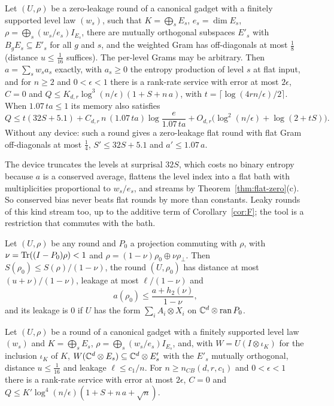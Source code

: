 \begin{theorem}\label{thm:conserved}
Let $(U,\rho)$ be a zero-leakage round of a canonical gadget with a
finitely supported level law $(w_s)$, such that $K=\bigoplus_sE_s$, $e_s=\dim E_s$, $\rho=\bigoplus_s(w_s/e_s)I_{E_s}$, there are
mutually orthogonal subspaces $E'_s$ with $B_gE_s\subseteq E'_s$ for all $g$ and $s$, and the weighted Gram has off-diagonals at most $\frac18$
(distance $u\le\frac1{16}$ suffices). The per-level Grams may be arbitrary. Then $a=\sum_sw_sa_s$ exactly, with $a_s\ge0$ the entropy
production of level $s$ at flat input, and for $n\ge2$ and $0<\epsilon<1$ there is a rank-rate service with error at most $2\epsilon$, $C=0$ and
$Q\le K_{d,r}\log^3(n/\epsilon)(1+S+n\,a)$, with $t=\lceil\log(4rn/\epsilon)/2\rceil$. When $1.07\,ta\le1$ its memory also satisfies
\[
Q\le t(32S+5.1)+C_{d,r}\,n\,(1.07\,ta)\log\frac e{1.07\,ta}+O_{d,r}\bigl(\log^2(n/\epsilon)+\log(2+tS)\bigr).
\] Without any device: such a round gives a zero-leakage flat round with flat Gram off-diagonals at most
$\frac14$, $S'\le32S+5.1$ and $a'\le1.07\,a$.
\end{theorem}

The device truncates the levels at surprisal $32S$, which costs no binary entropy because $a$ is a conserved average, flattens the level index
into a flat bath with multiplicities proportional to $w_s/e_s$, and streams by Theorem~\ref{thm:flat-zero}(c). So conserved bias never beats
flat rounds by more than constants. Leaky rounds of this kind stream too, up to the additive term of Corollary~\ref{cor:F}; the tool is a
restriction that commutes with the bath.

\begin{lemma}\label{lem:restrict-biased}
Let $(U,\rho)$ be any round and $P_0$ a projection commuting with $\rho$, with $\nu=\operatorname{Tr}((I-P_0)\rho)<1$ and $\rho=(1-\nu)\rho_0\oplus\nu\rho_\perp$.
Then $S(\rho_0)\le S(\rho)/(1-\nu)$, the round $(U,\rho_0)$ has distance at most $(u+\nu)/(1-\nu)$, leakage at most $\ell/(1-\nu)$ and
\[
a(\rho_0)\le\frac{a+h_2(\nu)}{1-\nu},
\]
and its leakage is $0$ if $U$ has the form $\sum_iA_i\otimes X_i$ on $\mathbb C^d\otimes\operatorname{ran}P_0$.
\end{lemma}

\begin{corollary}\label{cor:conserved-leaky}
Let $(U,\rho)$ be a round of a canonical gadget with a finitely
supported level law $(w_s)$ and $K=\bigoplus_sE_s$, $\rho=\bigoplus_s(w_s/e_s)I_{E_s}$, and, with $W=U(I\otimes\iota_K)$ for the inclusion
$\iota_K$ of $K$, $W(\mathbb C^d\otimes E_s)\subseteq\mathbb C^d\otimes E'_s$ with the
$E'_s$ mutually orthogonal, distance $u\le\frac1{16}$ and leakage $\ell\le c_1/n$. For $n\ge n_{CB}(d,r,c_1)$ and $0<\epsilon<1$ there is a rank-rate service
with error at most $2\epsilon$, $C=0$ and $Q\le K'\log^4(n/\epsilon)(1+S+n\,a+\sqrt n)$.
\end{corollary}


